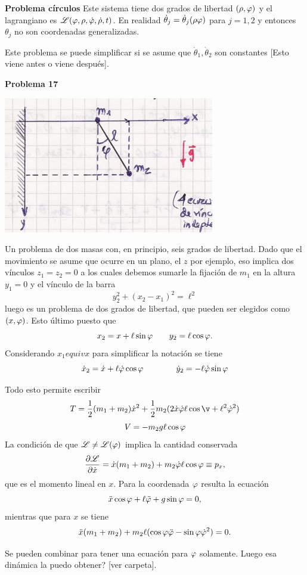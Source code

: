 \documentclass[10pt,oneside]{CBFT_book}
\begin{document}
\begin{ejemplo}{\bf Problema círculos}
Este sistema tiene dos grados de libertad $(\rho,\varphi)$ y el lagrangiano es $\mathscr{L}(\varphi,\rho,\dot{\varphi},\dot{\rho},t)$. En realidad
$\dot{\theta}_j = \dot{\theta}_j(\rho\varphi)$ para $j=1,2$ y entonces $\theta_j$ no son coordenadas generalizadas.

Este problema se puede simplificar si se asume que $ \dot{\theta}_1, \dot{\theta}_2 $ son constantes [Esto viene antes o viene después].
\end{ejemplo}


\begin{ejemplo}{\bf Problema 17}
 
\includegraphics[scale=0.3]{images/fig_mc_pendulo_deslizante.jpg} 

Un problema de dos masas con, en principio, seis grados de libertad. Dado que el movimiento se asume que ocurre en un plano, el $z$
por ejemplo, eso implica dos vínculos $z_1 = z_2 = 0$ a los cuales debemos sumarle la fijación de $m_1$ en la altura $y_1 = 0$ y el vínculo 
de la barra
\[
	y_2^2 + (x_2 -x_1)^2 = \ell^2
\]
luego es un problema de dos grados de libertad, que pueden ser elegidos como $(x,\varphi)$. Esto último puesto que 
\[
	x_2 = x + \ell \sin\varphi \qquad y_2 = \ell \cos \varphi.
\]
Considerando $x_1 equiv x$ para simplificar la notación se tiene 
\[
	\dot{x}_2 = \dot{x} + \ell \dot{\varphi}\cos\varphi \qquad \qquad \dot{y}_2 = -\ell \dot{\varphi} \sin\varphi
\]

Todo esto permite escribir 
\[
	T = \frac 1 2 ( m_1 + m_2 ) \dot{x}^2 + \frac 1 2 m_2 ( 2\dot{x}\dot{\vp} \ell\cos\v + \ell^2\dot{\vp}^2 )
\]
\[
	V = - m_2 g \ell \cos\varphi
\]
La condición de que $\mathscr{L} \neq \mathscr{L}(\varphi)$ implica la cantidad conservada
\[
	\frac{\partial^{\hspace{-0.05em}} {\mathscr{L}}}{\partial {\dot{x}}^{\hspace{-0.05em}}} = \dot{x}(m_1+m_2) + m_2 \dot{\varphi} \ell \cos\varphi \equiv p_x,
\]
que es el momento lineal en $x$. Para la coordenada $\varphi$ resulta la ecuación
\[
	\ddot{x}\cos\varphi + \ell\ddot{\varphi} + g\sin\varphi = 0,
\]
mientras que para $x$ se tiene 
\[
	\ddot{x}(m_1+m_2) + m_2 \ell (\cos \varphi \ddot{\varphi}-\sin\varphi \dot{\varphi}^2)	= 0.
\]

Se pueden combinar para tener una ecuación para $ \varphi $ solamente. Luego esa dinámica la puedo obtener? [ver carpeta].
\end{ejemplo}
\end{document}
